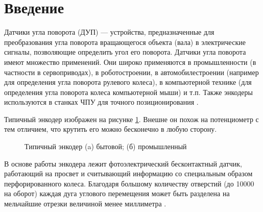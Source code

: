 \section*{Введение}

Датчики угла поворота (ДУП) --- устройства, предназначенные для преобразования угла поворота вращающегося объекта (вала) в электрические сигналы, позволяющие определить угол его поворота. Датчики угла поворота имеют множество применений. Они широко применяются в промышленности (в частности в сервоприводах), в роботостроении, в автомобилестроении (например для определения угла поворота рулевого колеса), в компьютерной технике (для определения угла поворота колеса компьютерной мыши) и т.п. \cite{wiki:rotary} Также энкодеры используются в станках ЧПУ для точного позиционирования \cite{educ:encoders}.

Типичный энкодер изображен на рисунке \ref{fig:encoder}. Внешне он похож на потенциометр с тем отличием, что крутить его можно бесконечно в любую сторону.

\begin{figure}[ht]
    \caption{Типичный энкодер (a) бытовой; (б) промышленный}
    \label{fig:encoder}
\end{figure}

В основе работы энкодера лежит фотоэлектрический бесконтактный датчик, работающий на просвет и считывающий информацию со специальным образом перфорированного колеса. Благодаря большому количеству отверстий (до 10000 на оборот) каждая дуга углового перемещения может быть разделена на мельчайшие отрезки величиной менее миллиметра \cite{rusauto:enc}.

